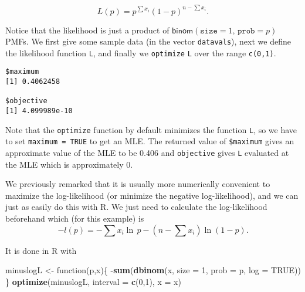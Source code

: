 \documentclass[]{book}
\newenvironment{Shaded}{\begin{snugshade}}{\end{snugshade}}
\newcommand{\KeywordTok}[1]{\textcolor[rgb]{0.13,0.29,0.53}{\textbf{{#1}}}}
\newcommand{\DataTypeTok}[1]{\textcolor[rgb]{0.13,0.29,0.53}{{#1}}}
\newcommand{\DecValTok}[1]{\textcolor[rgb]{0.00,0.00,0.81}{{#1}}}
\newcommand{\StringTok}[1]{\textcolor[rgb]{0.31,0.60,0.02}{{#1}}}
\newcommand{\OtherTok}[1]{\textcolor[rgb]{0.56,0.35,0.01}{{#1}}}
\newcommand{\NormalTok}[1]{{#1}}
\numberwithin{equation}{chapter}
\numberwithin{figure}{chapter}
\theoremstyle{plain}
\theoremstyle{definition}
\theoremstyle{remark}
\theoremstyle{definition}
\theoremstyle{definition}
\theoremstyle{remark}
\begin{document}
\begin{equation}
L(p)=p^{\sum x_{i}}(1-p)^{n-\sum x_{i}}.
\end{equation}

Notice that the likelihood is just a product of
\(\mathsf{binom}(\mathtt{size}=1,\,\mathtt{prob}=p)\) PMFs. We first
give some sample data (in the vector \texttt{datavals}), next we define
the likelihood function \texttt{L}, and finally we \texttt{optimize}
\texttt{L} over the range \texttt{c(0,1)}.

\begin{Shaded}
\end{Shaded}

\begin{verbatim}
$maximum
[1] 0.4062458

$objective
[1] 4.099989e-10
\end{verbatim}

Note that the \texttt{optimize} function by default minimizes the
function \texttt{L}, so we have to set \texttt{maximum\ =\ TRUE} to get
an MLE. The returned value of \texttt{\$maximum} gives an approximate
value of the MLE to be 0.406 and \texttt{objective} gives \texttt{L}
evaluated at the MLE which is approximately 0.

We previously remarked that it is usually more numerically convenient to
maximize the log-likelihood (or minimize the negative log-likelihood),
and we can just as easily do this with R. We just need to calculate the
log-likelihood beforehand which (for this example) is
\[ -l(p)=-\sum x_{i}\ln\,
p-\left(n-\sum x_{i}\right)\ln(1-p).  \]

It is done in R with

\begin{Shaded}
\begin{Highlighting}[]
\NormalTok{minuslogL <-}\StringTok{ }\NormalTok{function(p,x)\{}
                \NormalTok{-}\KeywordTok{sum}\NormalTok{(}\KeywordTok{dbinom}\NormalTok{(x, }\DataTypeTok{size =} \DecValTok{1}\NormalTok{, }\DataTypeTok{prob =} \NormalTok{p, }\DataTypeTok{log =} \OtherTok{TRUE}\NormalTok{))}
             \NormalTok{\}}
\KeywordTok{optimize}\NormalTok{(minuslogL, }\DataTypeTok{interval =} \KeywordTok{c}\NormalTok{(}\DecValTok{0}\NormalTok{,}\DecValTok{1}\NormalTok{), }\DataTypeTok{x =} \NormalTok{x)}
\end{Highlighting}
\end{Shaded}
\end{document}
